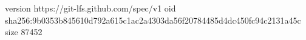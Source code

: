 version https://git-lfs.github.com/spec/v1
oid sha256:9b0353b845610d792a615c1ac2a4303da56f20784485d4dc450fc94c2131a45c
size 87452

